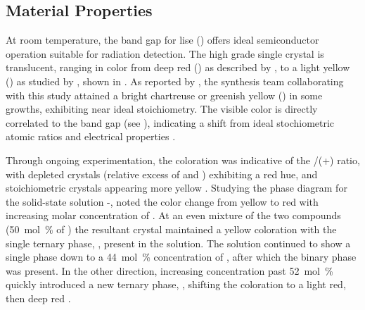 \documentclass[../../../main.tex]{subfiles}
\begin{document}
%
    \subsection{Material Properties}%
    \label{sec:chapter-2:lise:material-properties}%
    At room temperature, the band gap for \gls{lise} () offers ideal semiconductor operation suitable for radiation detection.
    The high grade single crystal is translucent, ranging in color from deep red () as described by \citeauthor*{Kamijoh_1981}, to a light yellow () as studied by \citeauthor*{Isaenko_2002}, shown in  \cite{Kamijoh_1981, Isaenko_2002}.
    As reported by \citeauthor*{Wiggins_2013}, the synthesis team collaborating with this study attained a bright chartreuse or greenish yellow () in some growths, exhibiting near ideal stoichiometry.
    The visible color is directly correlated to the band gap (see ), indicating a shift from ideal stochiometric atomic ratios and electrical properties \cite{Wiggins_2013}.
    \par%
    Through ongoing experimentation, the coloration was indicative of the /(+) ratio, with  depleted crystals (relative excess of  and ) exhibiting a red hue, and stoichiometric crystals appearing more yellow \cite{Petrov_2010, Wiggins_2013, Ma_2015a}.
    Studying the phase diagram for the \gls{solid-state} solution \--, \citeauthor*{Weise_2003} noted the color change from yellow to red with increasing molar concentration of .
    At an even mixture of the two compounds (\SI{50}{\mol\percent} of ) the resultant crystal maintained a yellow coloration with the single ternary phase, , present in the solution.
    The solution continued to show a single phase down to a \SI{44}{\mol\percent} concentration of , after which the binary  phase was present.
    In the other direction, increasing  concentration past \SI{52}{\mol\percent} quickly introduced a new ternary phase, , shifting the coloration to a light red, then deep red \cite{Weise_2003}.
\end{document}
